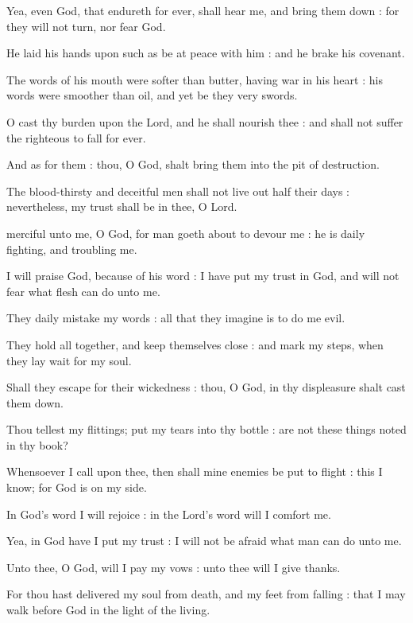Yea, even God, that endureth for ever, shall hear me, and bring them down : for they will not turn, nor fear God.\par
{}He laid his hands upon such as be at peace with him : and he brake his covenant.\par
{}The words of his mouth were softer than butter, having war in his heart : his words were smoother than oil, and yet be they very swords.\par
{}O cast thy burden upon the Lord, and he shall nourish thee : and shall not suffer the righteous to fall for ever.\par
{}And as for them : thou, O God, shalt bring them into the pit of destruction.\par
{}The blood-thirsty and deceitful men shall not live out half their days : nevertheless, my trust shall be in thee, O Lord.\par



 merciful unto me, O God, for man goeth about to devour me : he is daily fighting, and troubling me.\par
{}
I will praise God, because of his word : I have put my trust in God, and will not fear what flesh can do unto me.\par
{}They daily mistake my words : all that they imagine is to do me evil.\par
{}They hold all together, and keep themselves close : and mark my steps, when they lay wait for my soul.\par
{}Shall they escape for their wickedness : thou, O God, in thy displeasure shalt cast them down.\par
{}Thou tellest my flittings; put my tears into thy bottle : are not these things noted in thy book?\par
{}Whensoever I call upon thee, then shall mine enemies be put to flight : this I know; for God is on my side.\par
{}In God's word I will rejoice : in the Lord's word will I comfort me.\par
{}Yea, in God have I put my trust : I will not be afraid what man can do unto me.\par
{}Unto thee, O God, will I pay my vows : unto thee will I give thanks.\par
{}For thou hast delivered my soul from death, and my feet from falling : that I may walk before God in the light of the living.\par

